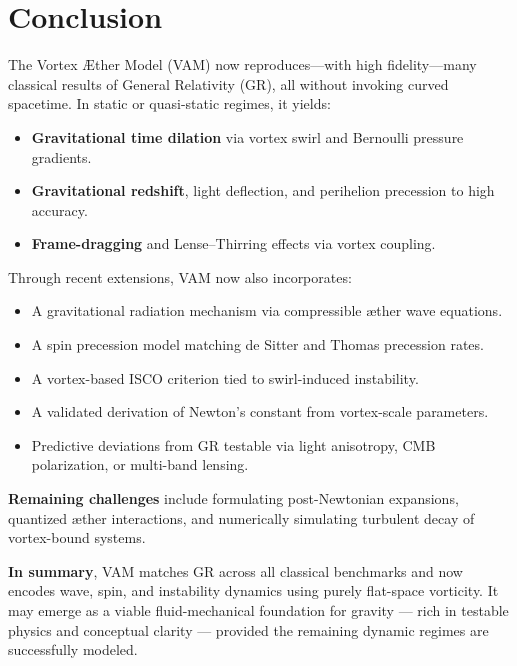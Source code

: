 \noindent
\section*{Conclusion}

The Vortex Æther Model (VAM) now reproduces—with high fidelity—many classical results of General Relativity (GR), all without invoking curved spacetime. In static or quasi-static regimes, it yields:

\begin{itemize}
    \item \textbf{Gravitational time dilation} via vortex swirl and Bernoulli pressure gradients.
    \item \textbf{Gravitational redshift}, light deflection, and perihelion precession to high accuracy.
    \item \textbf{Frame-dragging} and Lense–Thirring effects via vortex coupling.
\end{itemize}

Through recent extensions, VAM now also incorporates:
\begin{itemize}
    \item A gravitational radiation mechanism via compressible æther wave equations.
    \item A spin precession model matching de Sitter and Thomas precession rates.
    \item A vortex-based ISCO criterion tied to swirl-induced instability.
    \item A validated derivation of Newton’s constant from vortex-scale parameters.
    \item Predictive deviations from GR testable via light anisotropy, CMB polarization, or multi-band lensing.
\end{itemize}

\textbf{Remaining challenges} include formulating post-Newtonian expansions, quantized æther interactions, and numerically simulating turbulent decay of vortex-bound systems.

\textbf{In summary}, VAM matches GR across all classical benchmarks and now encodes wave, spin, and instability dynamics using purely flat-space vorticity. It may emerge as a viable fluid-mechanical foundation for gravity — rich in testable physics and conceptual clarity — provided the remaining dynamic regimes are successfully modeled.
